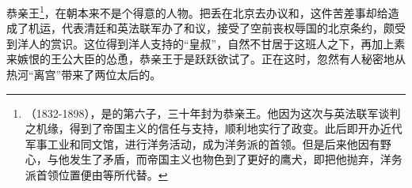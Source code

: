 恭亲王\footnote{（1832-1898），是的第六子，三十年封为恭亲王。他因为这次与英法联军谈判之机缘，得到了帝国主义的信任与支持，顺利地实行了政变。此后即开办近代军事工业和同文馆，进行洋务活动，成为洋务派的首领。但是后来他因有野心，与他发生了矛盾，而帝国主义也物色到了更好的鹰犬，即把他抛弃，洋务派首领位置便由等所代替。}，在朝本来不是个得意的人物。把丢在北京去办议和，这件苦差事却给造成了机运，代表清廷和英法联军办了和议，接受了空前丧权辱国的北京条约，颇受到洋人的赏识。这位得到洋人支持的“皇叔”，自然不甘居于这班人之下，再加上素来嫉恨的王公大臣的怂恿，恭亲王于是跃跃欲试了。正在这时，忽然有人秘密地从热河“离宫”带来了两位太后的。\\

